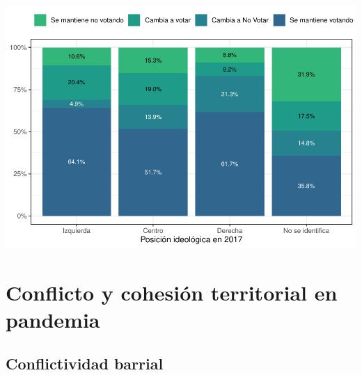 \documentclass[
  12pt,
]{book}
\begin{document}
\includegraphics{reporte-elsoc_files/figure-latex/cambio_participa-1.pdf}

\hypertarget{conflicto-y-cohesiuxf3n-territorial-en-pandemia}{%
\chapter{Conflicto y cohesión territorial en pandemia}\label{conflicto-y-cohesiuxf3n-territorial-en-pandemia}}

\hypertarget{conflictividad-barrial}{%
\section{Conflictividad barrial}\label{conflictividad-barrial}}
\end{document}
